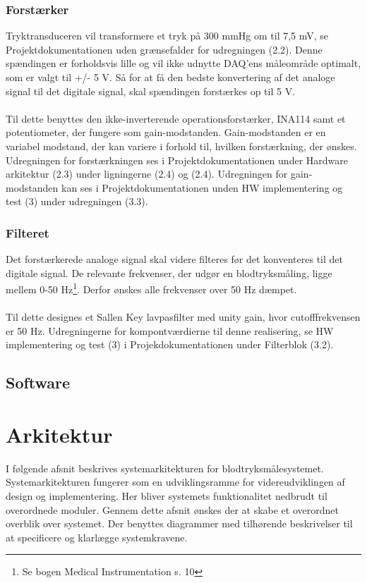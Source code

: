 \subsubsection{Forstærker}
Tryktransduceren vil transformere et tryk på 300 mmHg om til 7,5 mV, se Projektdokumentationen uden grænsefalder for udregningen (2.2). Denne spændingen er forholdsvis lille og vil ikke udnytte DAQ'ens måleområde optimalt, som er valgt til +/- 5 V. Så for at få den bedste konvertering af det analoge signal til det digitale signal, skal spændingen forstærkes op til 5 V. 
\\\\
Til dette benyttes den ikke-inverterende operationsforstærker, INA114 samt et potentiometer, der fungere som gain-modstanden. Gain-modstanden er en variabel modstand, der kan variere i forhold til, hvilken forstærkning, der ønskes. Udregningen for forstærkningen ses i Projektdokumentationen under Hardware arkitektur (2.3) under ligningerne (2.4) og (2.4). Udregningen for gain-modstanden kan ses i Projektdokumentationen unden HW implementering og test (3) under udregningen (3.3).     

\subsubsection{Filteret}
Det forstærkerede analoge signal skal videre filteres før det konventeres til det digitale signal. De relevante frekvenser, der udgør en blodtryksmåling, ligge mellem 0-50 Hz\footnote{Se bogen Medical Instrumentation s. 10}. Derfor ønskes alle frekvenser over 50 Hz dæmpet.
\\\\
Til dette designes et Sallen Key lavpasfilter med unity gain, hvor cutofffrekvensen er 50 Hz. Udregningerne for kompontværdierne til denne realisering, se HW implementering og test (3) i Projekdokumentationen under Filterblok (3.2).

\subsection{Software} 




        

\section{Arkitektur}
I følgende afsnit beskrives systemarkitekturen for blodtryksmålesystemet. Systemarkitekturen fungerer som en udviklingsramme for videreudviklingen af design og implementering. Her bliver systemets funktionalitet nedbrudt til overordnede moduler. Gennem dette afsnit ønskes der at skabe et overordnet overblik over systemet. Der benyttes diagrammer med tilhørende beskrivelser til at specificere og klarlægge systemkravene.

